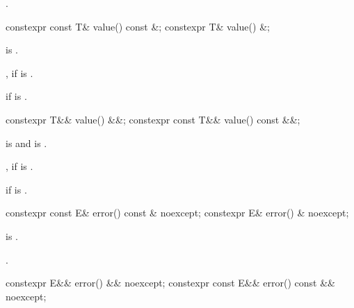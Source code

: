 \begin{itemdescr}
\pnum
\returns
{}.
\end{itemdescr}

%
\begin{itemdecl}
constexpr const T& value() const &;
constexpr T& value() &;
\end{itemdecl}

\begin{itemdescr}
\pnum
\mandates
{} is .

\pnum
\returns
{}, if  is .

\pnum
\throws
{} if  is .
\end{itemdescr}

%
\begin{itemdecl}
constexpr T&& value() &&;
constexpr const T&& value() const &&;
\end{itemdecl}

\begin{itemdescr}
\pnum
\mandates
{} is  and
 is .

\pnum
\returns
{}, if  is .

\pnum
\throws
{}
if  is .
\end{itemdescr}

%
\begin{itemdecl}
constexpr const E& error() const & noexcept;
constexpr E& error() & noexcept;
\end{itemdecl}

\begin{itemdescr}
\pnum
\expects
{} is .

\pnum
\returns
{}.
\end{itemdescr}

%
\begin{itemdecl}
constexpr E&& error() && noexcept;
constexpr const E&& error() const && noexcept;
\end{itemdecl}

